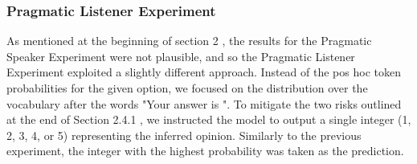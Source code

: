\documentclass[11pt]{article}
\begin{document}
\subsubsection{Pragmatic Listener Experiment}
\label{sec:exp3}


As mentioned at the beginning of section 2 , the results for the Pragmatic Speaker Experiment were not plausible, and so the Pragmatic Listener Experiment exploited a slightly different approach. Instead of the pos hoc token probabilities for the given option, we focused on the distribution over the vocabulary after the words "Your answer is ". To mitigate the two risks outlined at the end of Section 2.4.1 , we instructed the model to output a single integer (1, 2, 3, 4, or 5) representing the inferred opinion. %
Similarly to the previous experiment, the integer with the highest probability was taken as the prediction.



\end{document}
